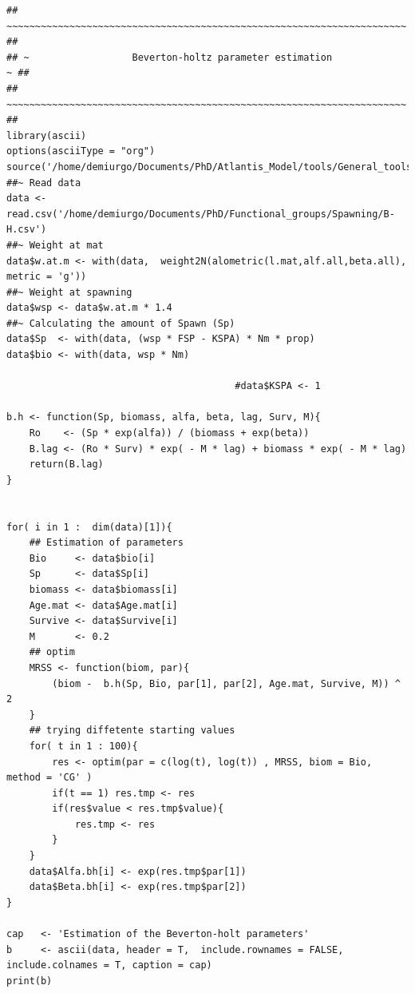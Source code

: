 \documentclass[11pt]{article}
\begin{document}
\begin{itemize}
\begin{itemize}
\begin{itemize}
\begin{itemize}
\begin{verbatim}
## ~~~~~~~~~~~~~~~~~~~~~~~~~~~~~~~~~~~~~~~~~~~~~~~~~~~~~~~~~~~~~~~~~~~~~~ ##
## ~                  Beverton-holtz parameter estimation               ~ ##
## ~~~~~~~~~~~~~~~~~~~~~~~~~~~~~~~~~~~~~~~~~~~~~~~~~~~~~~~~~~~~~~~~~~~~~~ ##
library(ascii)
options(asciiType = "org")
source('/home/demiurgo/Documents/PhD/Atlantis_Model/tools/General_tools/Atlantis_tools.R')
##~ Read data
data <- read.csv('/home/demiurgo/Documents/PhD/Functional_groups/Spawning/B-H.csv')
##~ Weight at mat
data$w.at.m <- with(data,  weight2N(alometric(l.mat,alf.all,beta.all), metric = 'g'))
##~ Weight at spawning
data$wsp <- data$w.at.m * 1.4
##~ Calculating the amount of Spawn (Sp)
data$Sp  <- with(data, (wsp * FSP - KSPA) * Nm * prop)
data$bio <- with(data, wsp * Nm)

                                        #data$KSPA <- 1

b.h <- function(Sp, biomass, alfa, beta, lag, Surv, M){
    Ro    <- (Sp * exp(alfa)) / (biomass + exp(beta))
    B.lag <- (Ro * Surv) * exp( - M * lag) + biomass * exp( - M * lag)
    return(B.lag)
}


for( i in 1 :  dim(data)[1]){
    ## Estimation of parameters
    Bio     <- data$bio[i]
    Sp      <- data$Sp[i]
    biomass <- data$biomass[i]
    Age.mat <- data$Age.mat[i]
    Survive <- data$Survive[i]
    M       <- 0.2
    ## optim
    MRSS <- function(biom, par){
        (biom -  b.h(Sp, Bio, par[1], par[2], Age.mat, Survive, M)) ^ 2
    }
    ## trying diffetente starting values
    for( t in 1 : 100){
        res <- optim(par = c(log(t), log(t)) , MRSS, biom = Bio, method = 'CG' )
        if(t == 1) res.tmp <- res
        if(res$value < res.tmp$value){
            res.tmp <- res
        }
    }
    data$Alfa.bh[i] <- exp(res.tmp$par[1])
    data$Beta.bh[i] <- exp(res.tmp$par[2])
}

cap   <- 'Estimation of the Beverton-holt parameters'
b     <- ascii(data, header = T,  include.rownames = FALSE, include.colnames = T, caption = cap)
print(b)
\end{verbatim}
\end{itemize}


\end{itemize}
\end{itemize}
\end{itemize}
\end{document}
